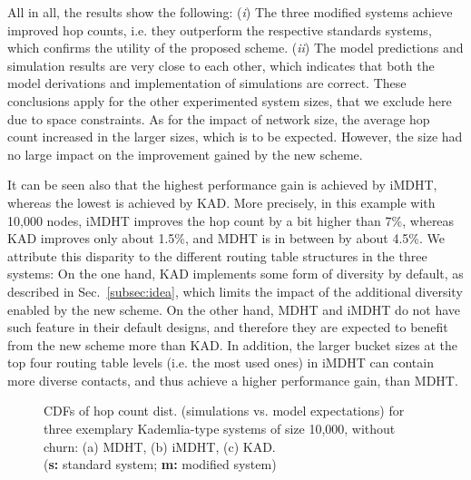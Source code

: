 \documentclass[10pt, conference, compsocconf, letterpaper]{IEEEtran}
\begin{document}
All in all, the results show the following: (\emph{i}) The three modified systems achieve improved hop counts, i.e. they outperform the respective standards systems, which confirms the utility of the proposed scheme. (\emph{ii}) The model predictions and simulation results are very close to each other, which indicates that both the model derivations and implementation of simulations are correct. These conclusions apply for the other experimented system sizes, that we exclude here due to space constraints. As for the impact of network size, the  average hop count increased in the larger sizes, which is to be expected. However,  the size had no large impact on the improvement gained by the new scheme.  

It can be seen also that the highest performance gain is achieved by iMDHT, whereas the lowest is achieved by KAD. More precisely, in this example with 10,000 nodes, iMDHT improves the hop count by a bit higher than 7\%, whereas KAD improves only about 1.5\%, and MDHT is in between by about 4.5\%. We attribute this disparity to the different routing table structures in the three systems: On the one hand, KAD implements some form of diversity by default, as described in Sec.~\ref{subsec:idea}, which limits the impact of the additional diversity enabled by the new scheme. On the other hand, MDHT and iMDHT do not have such feature in their default designs, and therefore they are expected to benefit from the new scheme more than KAD. In addition, the larger bucket sizes at the top four routing table levels (i.e. the most used ones) in iMDHT can contain more diverse contacts, and thus achieve a higher performance gain, than MDHT. 

















\begin{figure*}[ht]
\centering
\captionsetup{font=scriptsize}
\caption{CDFs of hop count dist. (simulations vs. model expectations) for three exemplary Kademlia-type systems of size 10,000, without churn: (a) MDHT, (b) iMDHT, (c) KAD. \\(\textbf{s:} standard system; \textbf{m:} modified system)}
\label{fig:hop_count_dist}
\end{figure*}
\end{document}
